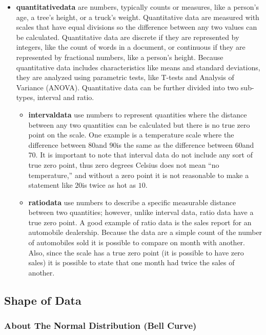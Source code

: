 \begin{itemize}
	\item \textbf{\Gls{quantitativedata}} are numbers, typically counts or measures, like a person's age, a tree's height, or a truck's weight. Quantitative data are measured with scales that have equal divisions so the difference between any two values can be calculated. Quantitative data are discrete if they are represented by integers, like the count of words in a document, or continuous if they are represented by fractional numbers, like a person's height. Because quantitative data includes characteristics like means and standard deviations, they are analyzed using parametric tests, like T-tests and Analysis of Variance (ANOVA). Quantitative data can be further divided into two sub-types, interval and ratio.
	
	\begin{itemize}
		\item \textbf{\Gls{intervaldata}} use numbers to represent quantities where the distance between any two quantities can be calculated but there is no true zero point on the scale. One example is a temperature scale where the difference between $ 80 $\textdegree and $ 90 $\textdegree is the same as the difference between $ 60 $\textdegree and $ 70 $\textdegree. It is important to note that interval data do not include any sort of true zero point, thus zero degrees Celsius does not mean ``no temperature,'' and without a zero point it is not reasonable to make a statement like $ 20 $\textdegree is twice as hot as $ 10 $\textdegree.
		
		\item \textbf{\Gls{ratiodata}} use numbers to describe a specific measurable distance between two quantities; however, unlike interval data, ratio data have a true zero point. A good example of ratio data is the sales report for an automobile dealership. Because the data are a simple count of the number of automobiles sold it is possible to compare on month with another. Also, since the scale has a true zero point (it is possible to have zero sales) it is possible to state that one month had twice the sales of another.
	\end{itemize}
\end{itemize}

\subsection{Shape of Data}

\subsubsection{About The Normal Distribution (Bell Curve)}

